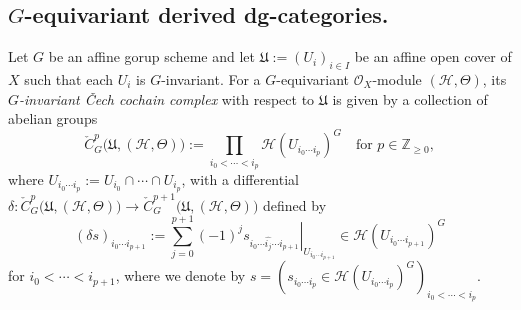 \subsection[equivariant dg categories]{$G$-equivariant derived dg-categories.} 
Let $G$ be an affine gorup scheme and let
$\mathfrak U:=(U_i)_{i\in I}$
be an affine open cover of $X$
such that each $U_i$ is $G$-invariant.
For a $G$-equivariant $\mathcal O_X$-module $(\mathcal H,\Theta)$,
its \emph{$G$-invariant Čech cochain complex} with respect to
$\mathfrak U$ is
given by a collection of abelian groups
$$
\check C_G^p\big(\mathfrak U,(\mathcal H,\Theta)\big)
:=
\prod_{i_0<\cdots<i_p}
\mathcal H(U_{i_0\cdots i_p})^G
\quad\text{for }p\in\mathbb{Z}_{\ge0},
$$
where
$U_{i_0\cdots i_p}:= U_{i_0}\cap\cdots\cap U_{i_p}$,
with a differential
$
\delta:
\check{C}_G^p\big(\mathfrak{U},(\mathcal{H},\Theta)\big)
\rightarrow
\check{C}_G^{p+1}\big(\mathfrak{U},(\mathcal{H},\Theta)\big)
$
defined by
$$
(\delta s)_{i_0\cdots i_{p+1}}
:=
\sum_{j=0}^{p+1}(-1)^j
\left.
s_{i_0\cdots\widehat{i_j}\cdots i_{p+1}}
\right|_{U_{i_0\cdots i_{p+1}}}
\in
\mathcal{H}(U_{i_0\cdots i_{p+1}})^G
$$
for
$i_0<\cdots<i_{p+1}$,
where we denote by
$s=\left(s_{i_0\cdots i_p}\in\mathcal{H}(U_{i_0\cdots i_p})^G\right)_{i_0<\cdots<i_p}.$
